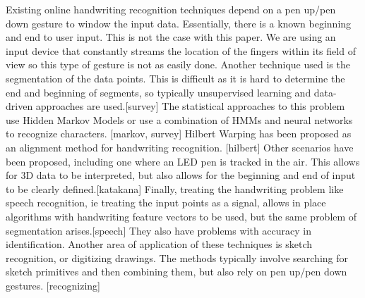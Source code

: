Existing online handwriting recognition techniques depend on a pen up/pen down gesture to window the input data. Essentially, there is a known beginning and end to user input. This is not the case with this paper. We are using an input device that constantly streams the location of the fingers within its field of view so this type of gesture is not as easily done. Another technique used is the segmentation of the data points. This is difficult as it is hard to determine the end and beginning of segments, so typically unsupervised learning and data-driven approaches are used.[survey] The statistical approaches to this problem use Hidden Markov Models or use a combination of HMMs and neural networks to recognize characters. [markov, survey] Hilbert Warping has been proposed as an alignment method for handwriting recognition. [hilbert] Other scenarios have been proposed, including one where an LED pen is tracked in the air. This allows for 3D data to be interpreted, but also allows for the beginning and end of input to be clearly defined.[katakana] Finally, treating the handwriting problem like speech recognition, ie treating the input points as a signal, allows in place algorithms with handwriting feature vectors to be used, but the same problem of segmentation arises.[speech] They also have problems with accuracy in identification. 
Another area of application of these techniques is sketch recognition, or digitizing drawings. The methods typically involve searching for sketch primitives and then combining them, but also rely on pen up/pen down gestures. [recognizing]
